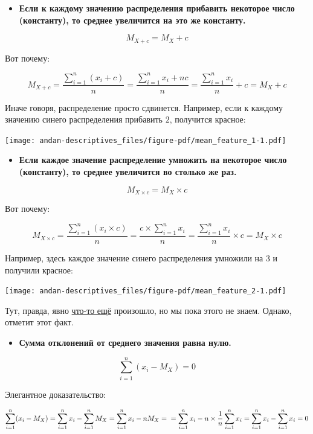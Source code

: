 \documentclass[
  letterpaper,
  DIV=11,
  numbers=noendperiod]{scrreprt}
\providecommand{\tightlist}{%
  \setlength{\itemsep}{0pt}\setlength{\parskip}{0pt}}\usepackage{longtable,booktabs,array}
\theoremstyle{definition}
\theoremstyle{remark}
\begin{document}
\begin{itemize}
\tightlist
\item
  \textbf{Если к каждому значению распределения прибавить некоторое
  число (константу), то среднее увеличится на это же константу.}
\end{itemize}

\[
M_{X+c} = M_X + c
\]

Вот почему:

\[
M_{X+c} = \frac{\sum_{i=1}^n (x_i + c)}{n} = \frac{\sum_{i=1}^n x_i + nc}{n} = \frac{\sum_{i=1}^n x_i}{n} + c = M_X + c
\]

Иначе говоря, распределение просто сдвинется. Например, если к каждому
значению синего распределения прибавить \(2\), получится красное:

\texttt{[image: andan-descriptives\_files/figure-pdf/mean\_feature\_1-1.pdf]}

\begin{itemize}
\tightlist
\item
  \textbf{Если каждое значение распределение умножить на некоторое число
  (константу), то среднее увеличится во столько же раз.}
\end{itemize}

\[
M_{X \times c} = M_X \times c
\]

Вот почему:

\[
M_{X \times c} = \frac{\sum_{i=1}^n (x_i \times c)}{n} = \frac{c \times \sum_{i=1}^n x_i}{n} = \frac{\sum_{i=1}^n x_i}{n} \times c = M_X \times c
\]

Например, здесь каждое значение синего распределения умножили на \(3\) и
получили красное:

\texttt{[image: andan-descriptives\_files/figure-pdf/mean\_feature\_2-1.pdf]}

Тут, правда, явно \hyperref[var_features]{что-то ещё} произошло, но мы
пока этого не знаем. Однако, отметит этот факт.

\begin{itemize}
\tightlist
\item
  \textbf{Сумма отклонений от среднего значения равна нулю.}
\end{itemize}

\[
\sum_{i=1}^n(x_i - M_X) = 0
\]

Элегантное доказательство:

\[
\sum_{i=1}^n(x_i - M_X) = \sum_{i=1}^n x_i - \sum_{i=1}^n M_X = \sum_{i=1}^n x_i - nM_X = \\
= \sum_{i=1}^n x_i - n \times \frac{1}{n} \sum_{i=1}^n x_i = \sum_{i=1}^n x_i - \sum_{i=1}^n x_i = 0
\]
\end{document}
